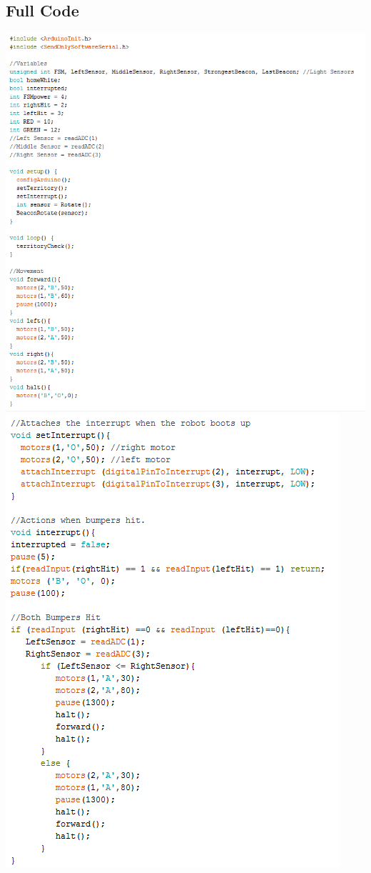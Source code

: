 \documentclass{article}
\begin{document}
\subsection{Full Code}
\begin{center}
\includegraphics[width=\textwidth]{FullCode1.png}
\includegraphics[]{FullCode2.png}

\end{center}
\end{document}
